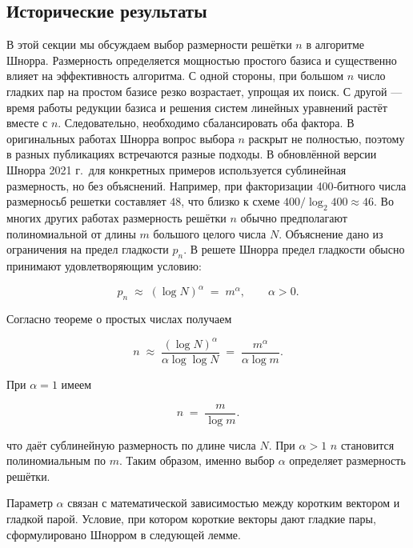 
\subsection*{Исторические результаты}

В этой секции мы обсуждаем выбор размерности решётки $n$ в алгоритме Шнорра.
Размерность определяется мощностью простого базиса и существенно влияет на
эффективность алгоритма. С одной стороны, при большом $n$ число гладких пар на
простом базисе резко возрастает, упрощая их поиск. С другой — время работы
редукции базиса и решения систем линейных уравнений растёт вместе с $n$.
Следовательно, необходимо сбалансировать оба фактора. В оригинальных работах
Шнорра \cite{cite_29,cite_30,cite_41} вопрос выбора $n$ раскрыт не полностью,
поэтому в разных публикациях встречаются разные подходы. В обновлённой версии
Шнорра 2021 г.\,\cite{cite_30} для конкретных примеров используется сублинейная
размерность, но без объяснений. Например, при факторизации 400‑битного числа
размерносьб решетки составляет $48$, что близко к схеме $400/\log_{2}400
\approx 46$. Во многих других работах размерность решётки $n$ обычно
предполагают полиномиальной от длины $m$ большого целого числа $N$. Объяснение
дано из ограничения на предел гладкости $p_{n}$. В решете Шнорра предел
гладкости обысно принимают удовлетворяющим условию:

\begin{equation}
    p_{n} \;\approx\; (\log N)^{\alpha} \;=\; m^{\alpha},
    \qquad \alpha>0 .
\end{equation}

Согласно теореме о простых числах получаем

\begin{equation}
    n \;\approx\; \frac{(\log N)^{\alpha}}{\alpha\log\log N}
    \;=\; \frac{m^{\alpha}}{\alpha\log m}.
\end{equation}

При $\alpha = 1$ имеем

\begin{equation}
    n \;=\; \frac{m}{\log m}.
\end{equation}

что даёт сублинейную размерность по длине числа $N$. При $\alpha>1$ $n$
становится полиномиальным по $m$. Таким образом, именно выбор $\alpha$
определяет размерность решётки.

Параметр $\alpha$ связан с математической зависимостью между коротким вектором
и гладкой парой. Условие, при котором короткие векторы дают гладкие пары,
сформулировано Шнорром в следующей лемме.

